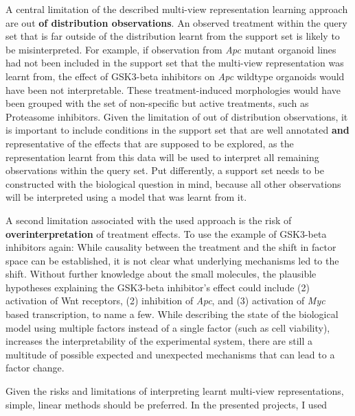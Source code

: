 \begin{flushleft}
A central limitation of the described multi-view representation learning approach are out \textbf{of distribution observations}. An observed treatment within the query set that is far outside of the distribution learnt from the support set is likely to be misinterpreted. For example, if observation from \textit{Apc} mutant organoid lines had not been included in the support set that the multi-view representation was learnt from, the effect of GSK3-beta inhibitors on \textit{Apc} wildtype organoids would have been not interpretable. These treatment-induced morphologies would have been grouped with the set of non-specific but active treatments, such as Proteasome inhibitors. Given the limitation of out of distribution observations, it is important to include conditions in the support set that are well annotated \textbf{and} representative of the effects that are supposed to be explored, as the representation learnt from this data will be used to interpret all remaining observations within the query set. Put differently, a support set needs to be constructed with the biological question in mind, because all other observations will be interpreted using a model that was learnt from it.
\par

A second limitation associated with the used approach is the risk of \textbf{overinterpretation} of treatment effects. To use the example of GSK3-beta inhibitors again: While causality between the treatment and the shift in factor space can be established, it is not clear what underlying mechanisms led to the shift. Without further knowledge about the small molecules, the plausible hypotheses explaining the GSK3-beta inhibitor's effect could include (2) activation of Wnt receptors, (2) inhibition of \textit{Apc}, and (3) activation of \textit{Myc} based transcription, to name a few. While describing the state of the biological model using multiple factors instead of a single factor (such as cell viability), increases the interpretability of the experimental system, there are still a multitude of possible expected and unexpected mechanisms that can lead to a factor change.
\par






Given the risks and limitations of interpreting learnt multi-view representations, simple, linear methods should be preferred. In the presented projects, I used 



\end{flushleft}
